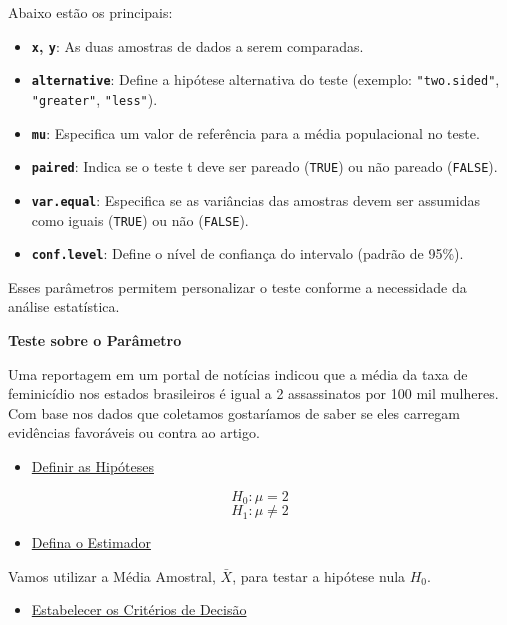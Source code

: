 \documentclass[
  letterpaper,
  DIV=11,
  numbers=noendperiod]{scrreprt}
\providecommand{\tightlist}{%
  \setlength{\itemsep}{0pt}\setlength{\parskip}{0pt}}
\begin{document}
Abaixo estão os principais:

\begin{itemize}
\tightlist
\item
  \textbf{\texttt{x}, \texttt{y}}: As duas amostras de dados a serem
  comparadas.\\
\item
  \textbf{\texttt{alternative}}: Define a hipótese alternativa do teste
  (exemplo: \texttt{"two.sided"}, \texttt{"greater"},
  \texttt{"less"}).\\
\item
  \textbf{\texttt{mu}}: Especifica um valor de referência para a média
  populacional no teste.\\
\item
  \textbf{\texttt{paired}}: Indica se o teste t deve ser pareado
  (\texttt{TRUE}) ou não pareado (\texttt{FALSE}).\\
\item
  \textbf{\texttt{var.equal}}: Especifica se as variâncias das amostras
  devem ser assumidas como iguais (\texttt{TRUE}) ou não
  (\texttt{FALSE}).\\
\item
  \textbf{\texttt{conf.level}}: Define o nível de confiança do intervalo
  (padrão de 95\%).
\end{itemize}

Esses parâmetros permitem personalizar o teste conforme a necessidade da
análise estatística.

\textbf{Teste sobre o Parâmetro}

Uma reportagem em um portal de notícias indicou que a média da taxa de
feminicídio nos estados brasileiros é igual a 2 assassinatos por 100 mil
mulheres. Com base nos dados que coletamos gostaríamos de saber se eles
carregam evidências favoráveis ou contra ao artigo.

\begin{itemize}
\tightlist
\item
  \ul{Definir as Hipóteses}
\end{itemize}

\[H_0: \mu = 2\] \[H_1:\mu \neq 2 \]

\begin{itemize}
\tightlist
\item
  \ul{Defina o Estimador}
\end{itemize}

Vamos utilizar a Média Amostral, \(\bar{X}\), para testar a hipótese
nula \(H_0\).

\begin{itemize}
\tightlist
\item
  \ul{Estabelecer os Critérios de Decisão}
\end{itemize}
\end{document}
